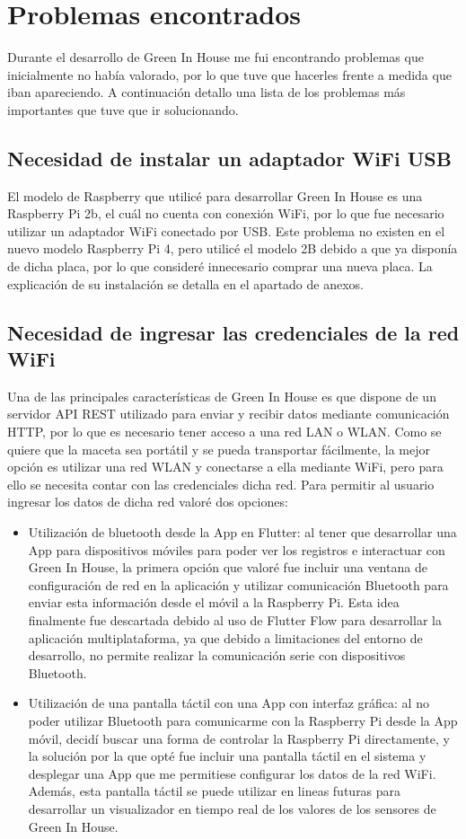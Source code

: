 \section{Problemas encontrados}
Durante el desarrollo de Green In House me fui encontrando problemas que inicialmente no había valorado, por lo que tuve que hacerles frente a medida que iban apareciendo. A continuación detallo una lista de los problemas más importantes que tuve que ir solucionando.

    \subsection{Necesidad de instalar un adaptador WiFi USB}  
    El modelo de Raspberry que utilicé para desarrollar Green In House es una Raspberry Pi 2b, el cuál no cuenta con conexión WiFi, por lo que fue necesario utilizar un adaptador WiFi conectado por USB. Este problema no existen en el nuevo modelo Raspberry Pi 4, pero utilicé el modelo 2B debido a que ya disponía de dicha placa, por lo que consideré innecesario comprar una nueva placa. La explicación de su instalación se detalla en el apartado de anexos.
    
    \subsection{Necesidad de ingresar las credenciales de la red WiFi}
    Una de las principales características de Green In House es que dispone de un servidor API REST utilizado para enviar y recibir datos mediante comunicación HTTP, por lo que es necesario tener acceso a una red LAN o WLAN. Como se quiere que la maceta sea portátil y se pueda transportar fácilmente, la mejor opción es utilizar una red WLAN y conectarse a ella mediante WiFi, pero para ello se necesita contar con las credenciales dicha red. Para permitir al usuario ingresar los datos de dicha red valoré dos opciones:
    \begin{itemize}
        \item Utilización de bluetooth desde la App en Flutter: al tener que desarrollar una App para dispositivos móviles para poder ver los registros e interactuar con Green In House, la primera opción que valoré fue incluir una ventana de configuración de red en la aplicación y utilizar comunicación Bluetooth para enviar esta información desde el móvil a la Raspberry Pi. Esta idea finalmente fue descartada debido al uso de Flutter Flow para desarrollar la aplicación multiplataforma, ya que debido a limitaciones del entorno de desarrollo, no permite realizar la comunicación serie con dispositivos Bluetooth.
        \item Utilización de una pantalla táctil con una App con interfaz gráfica: al no poder utilizar Bluetooth para comunicarme con la Raspberry Pi desde la App móvil, decidí buscar una forma de controlar la Raspberry Pi directamente, y la solución por la que opté fue incluir una pantalla táctil en el sistema y desplegar una App que me permitiese configurar los datos de la red WiFi. Además, esta pantalla táctil se puede utilizar en lineas futuras para desarrollar un visualizador en tiempo real de los valores de los sensores de Green In House.
    \end{itemize}
    
